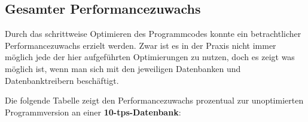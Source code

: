 \clearpage

% 
% 
% 

\subsection{Gesamter Performancezuwachs}
Durch das schrittweise Optimieren des Programmcodes konnte ein betrachtlicher
Performancezuwachs erzielt werden. Zwar ist es in der Praxis nicht immer möglich
jede der hier aufgeführten Optimierungen zu nutzen, doch es zeigt was möglich
ist, wenn man sich mit den jeweiligen Datenbanken und Datenbanktreibern beschäftigt.

Die folgende Tabelle zeigt den Performancezuwachs prozentual zur unoptimierten
Programmversion an einer \textbf{10-tps-Datenbank}: 



\clearpage